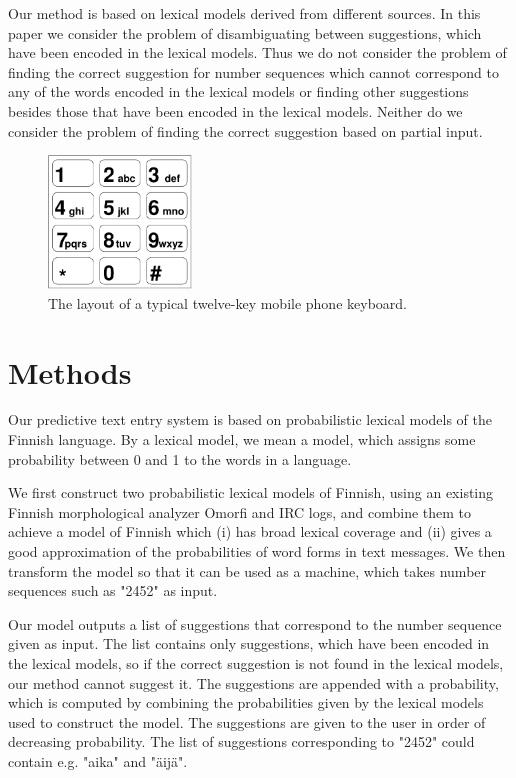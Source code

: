 \documentclass[a4paper,conference]{IEEEtran}
\begin{document}
Our method is based on lexical models derived from different
sources. In this paper we consider the problem of disambiguating
between suggestions, which have been encoded in the lexical
models. Thus we do not consider the problem of finding the correct
suggestion for number sequences which cannot correspond to any of the
words encoded in the lexical models or finding other suggestions besides
those that have been encoded in the lexical models. Neither do we
consider the problem of finding the correct suggestion based on
partial input.

\begin{figure}
\begin{center}
\includegraphics[width=1.5in]{keypad.pdf}
\end{center}
\caption{The layout of a typical twelve-key mobile phone keyboard.}
\label{fig:keypad}
\end{figure}

\section{Methods}
\label{sec:methods}

Our predictive text entry system is based on probabilistic lexical
models of the Finnish language. By a lexical model, we mean a model,
which assigns some probability between 0 and 1 to the words in a
language.

We first construct two probabilistic lexical models of Finnish,
using an existing Finnish morphological analyzer Omorfi and IRC logs, and combine
them to achieve a model of Finnish which (i) has broad lexical
coverage and (ii) gives a good approximation of the probabilities of
word forms in text messages. We then transform the model so that it
can be used as a machine, which takes number sequences such as "2452"
as input.

Our model outputs a list of suggestions that correspond to the number
sequence given as input. The list contains only suggestions, which
have been encoded in the lexical models, so if the correct suggestion
is not found in the lexical models, our method cannot suggest it. The
suggestions are appended with a probability, which is computed by
combining the probabilities given by the lexical models used to
construct the model. The suggestions are given to the user in order of
decreasing probability. The list of suggestions corresponding to
"2452" could contain e.g. "aika" and "äijä".
\end{document}
